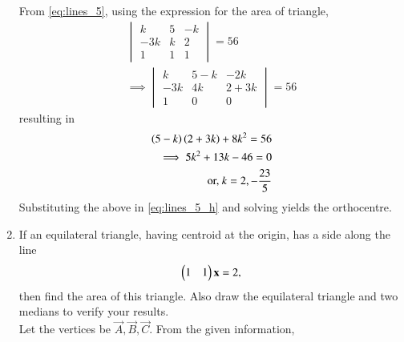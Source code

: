 \documentclass[journal,12pt,twocolumn]{IEEEtran}
\begin{document}
\begin{enumerate}[label=\arabic*]
From \eqref{eq:lines_5}, using the expression for the area of triangle,
\begin{align}
\begin{vmatrix}
k & 5 & -k\\-3k & k & 2 \\ 1 & 1 & 1
\end{vmatrix} = 56
\nonumber \\
\implies
\begin{vmatrix}
k & 5-k & -2k\\-3k & 4k & 2+3k \\ 1 & 0 & 0
\end{vmatrix} = 56
\end{align}
%
resulting in
\begin{align}
\left(5-k\right)
\left(2+3k\right)+8k^2=56
\\
\implies 5k^2+13k-46 = 0
\\
\text{or, } k = 2, -\frac{23}{5}
\end{align}
Substituting the above in \eqref{eq:lines_5_h} and solving yields the orthocentre.
\item If an equilateral triangle, having centroid at the origin, has a side along the line
\begin{equation}
\label{eq:lines_6_ab}
\begin{pmatrix}1 & 1\end{pmatrix}\mathbf{x} = 2,
\end{equation}
then find the area of this triangle. Also draw the equilateral triangle and two medians to verify your results.
\\
\solution Let the vertices be $\vec{A},\vec{B},\vec{C}$. From the given information, 

\end{enumerate}
\end{document}
